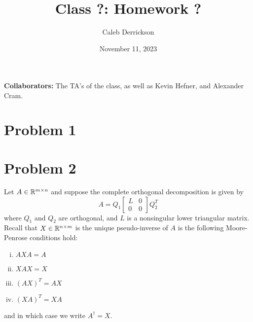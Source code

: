 

\title{Class ?: Homework ?}
\author{Caleb Derrickson}
\date{November 11, 2023}


\onehalfspacing
\maketitle
\allowdisplaybreaks
{\color{cit}\vspace{2mm}\noindent\textbf{Collaborators:}} The TA's of the class, as well as Kevin Hefner, and Alexander Cram.

\tableofcontents

\newpage
\section{Problem 1}


\newpage
\section{Problem 2}
Let $A \in \mathbb{R}^{m \times n}$ and suppose the complete orthogonal decomposition is given by
\[
A = Q_1 \begin{bmatrix}L &0\\0&0\end{bmatrix}Q_2^T
\]
where $Q_1$ and $Q_2$ are orthogonal, and $L$ is a nonsingular lower triangular matrix. Recall that $X \in \mathbb{R}^{n \times m}$ is the unique pseudo-inverse of $A$ is the following Moore-Penrose conditions hold:
\begin{enumerate}[(i)]
    \item $AXA = A$ 
    \item $XAX = X$ 
    \item $(AX)^T = AX$ 
    \item $(XA)^T = XA$
\end{enumerate}
and in which case we write $A^\dag = X$.

